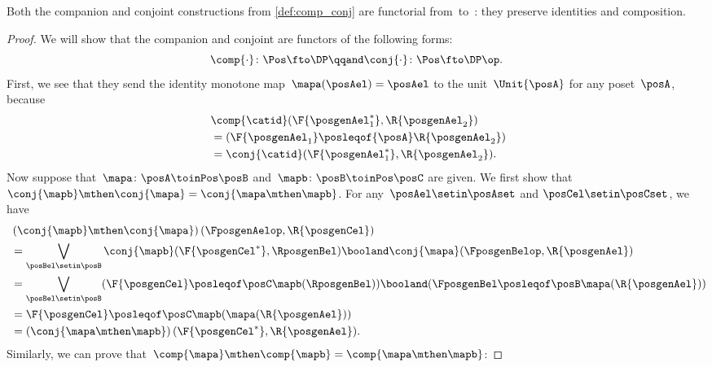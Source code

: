 \begin{lemma}
    \label{lem:comp_conj}
    Both the companion and conjoint constructions from \cref{def:comp_conj} are functorial from~\Pos to~\DP: they preserve identities and composition.
\end{lemma}
\begin{proof}
    We will show that the companion and conjoint are functors of the following forms:
    \begin{equation}
        \comp{\cdot}\colon\Pos\fto\DP
        \qqand
        \conj{\cdot}\colon\Pos\fto\DP\op.
    \end{equation}
    First, we see that they send the identity monotone map~$\mapa(\posAel)=\posAel$ to the unit~$\Unit{\posA }$ for any poset~$\posA$, because
    \begin{equation}
        \begin{aligned}
            ~ & \comp{\catid}(\F{\posgenAel_1^*},\R{\posgenAel_2}) \\
              & = (\F{\posgenAel_1} \posleqof{\posA} \R{\posgenAel_2}) \\
              & =\conj{\catid}(\F{\posgenAel_1^*},\R{\posgenAel_2}).
        \end{aligned}
    \end{equation}
    Now suppose that~$\mapa\colon  \posA \toinPos \posB $ and~$\mapb\colon \posB \toinPos \posC$ are given.
    We first show that $\conj{\mapb}\mthen\conj{\mapa}=\conj{\mapa\mthen \mapb}$.
    For any~$\posAel\setin \posAset$ and $\posCel\setin \posCset$, we have
    \begin{equation}
        \begin{aligned}
            ~ & \left(\conj{\mapb}\mthen \conj{\mapa}\right)(\FposgenAelop,\R{\posgenCel}) \\
              & =\bigvee_{\posBel\setin \posB} \conj{\mapb}(\F{\posgenCel^*},\RposgenBel)\booland\conj{\mapa}(\FposgenBelop,\R{\posgenAel}) \\
              & =\bigvee_{\posBel\setin \posB} (\F{\posgenCel}\posleqof\posC \mapb(\RposgenBel)) \booland (\FposgenBel\posleqof\posB \mapa(\R{\posgenAel})) \\
              & = \F{\posgenCel}\posleqof\posC \mapb(\mapa(\R{\posgenAel})) \\
              & =\left(\conj{\mapa\mthen \mapb}\right)(\F{\posgenCel^*},\R{\posgenAel}).
        \end{aligned}
    \end{equation}
    Similarly, we can prove that~$\comp{\mapa}\mthen \comp{\mapb}=\comp{\mapa\mthen \mapb}$:

\end{proof}
